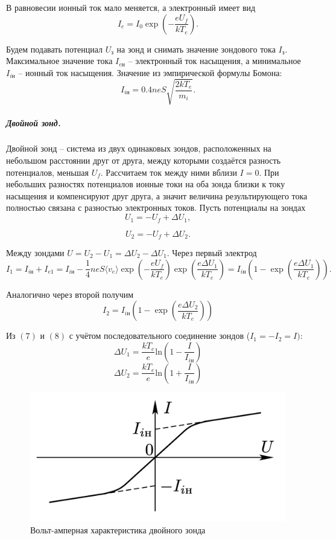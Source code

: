\documentclass[12pt,a4paper]{article}
\begin{document}
В равновесии ионный ток мало меняется, а электронный имеет вид
\[I_e = I_0 \exp\left( -\dfrac{eU_f}{kT_e} \right).\]

Будем подавать потенциал $U_\text{з}$ на зонд и снимать значение зондового тока $I_\text{з}$. 
Максимальное значение тока $I_{e\text{н}}$ -- электронный ток насыщения, а минимальное $I_{i\text{н}}$ -- ионный ток насыщения. 
Значение из эмпирической формулы Бомона:
\begin{equation}
    I_{i\text{н}} = 0.4 neS \sqrt{\dfrac{2kT_e}{m_i}}.
\end{equation}

\subparagraph*{Двойной зонд.}
Двойной зонд -- система из двух одинаковых зондов, расположенных на небольшом расстоянии друг от друга, между которыми создаётся разность потенциалов, меньшая $U_f$. 
Рассчитаем ток между ними вблизи $I=0$. 
При небольших разностях потенциалов ионные токи на оба зонда близки к току насыщения и компенсируют друг друга, а значит величина результирующего тока полностью связана с разностью электронных токов. 
Пусть потенциалы на зондах
\[U_1 = -U_f + \Delta U_1,\]

\[U_2 = -U_f + \Delta U_2.\]

Между зондами $U = U_2 - U_1 = \Delta U_2 - \Delta U_1$.
Через первый электрод
\begin{equation}
    I_1 = I_{iн} + I_{e1} = I_{iн} - \dfrac{1}{4}neS\langle v_e\rangle \exp\left(-\dfrac{eU_f}{kT_e}\right)\exp\left(\dfrac{e\Delta U_1}{kT_e}\right)=I_{iн}\left(1 - \exp\left( \dfrac{e\Delta U_1}{kT_e} \right)\right).
\end{equation}

Аналогично через второй получим
\begin{equation}
    I_2 = I_{iн}\left(1 - \exp\left( \dfrac{e\Delta U_2}{kT_e} \right)\right)
\end{equation}
  
Из $(7)$ и $(8)$ с учётом последовательного соединение зондов ($I_1 = -I_2 = I)$:
\[\Delta U_1= \dfrac{kT_e}{e}\text{ln}\left(1 - \dfrac{I}{I_{iн}}\right)\]
\[\Delta U_2= \dfrac{kT_e}{e}\text{ln}\left(1 + \dfrac{I}{I_{iн}}\right)\]

\begin{figure}
    \includegraphics[width=\linewidth]{3.png}
    \caption{\small{Вольт-амперная характеристика двойного зонда}}
\end{figure}
\end{document}
